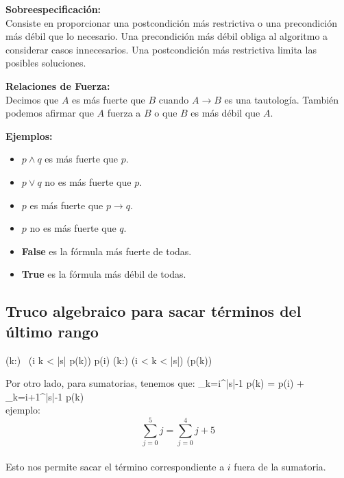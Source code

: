 \documentclass[9pt]{extarticle}  %
\begin{document}
\noindent\textbf{Sobreespecificación:} \\
Consiste en proporcionar una postcondición más restrictiva o una precondición más débil que lo necesario. Una precondición más débil obliga al algoritmo a considerar casos innecesarios. Una postcondición más restrictiva limita las posibles soluciones.

\noindent\textbf{Relaciones de Fuerza:} \\
Decimos que \(A\) es más fuerte que \(B\) cuando \(A \rightarrow B\) es una tautología. También podemos afirmar que \(A\) fuerza a \(B\) o que \(B\) es más débil que \(A\).

\noindent\textbf{Ejemplos:}
\begin{itemize}
\vspace{-0.3cm}
    \item \(p \land q\) es más fuerte que \(p\).
    \vspace{-0.3cm}
    \item \(p \lor q\) no es más fuerte que \(p\).
\vspace{-0.3cm}
    \item \(p\) es más fuerte que \(p \rightarrow q\).
    \vspace{-0.3cm}
    \item \(p\) no es más fuerte que \(q\).
    \vspace{-0.3cm}
    \item \textbf{False} es la fórmula más fuerte de todas.
    \vspace{-0.3cm}
    \item \textbf{True} es la fórmula más débil de todas.
    \vspace{-0.3cm}
\end{itemize}
\subsection*{\tiny {Truco algebraico para sacar términos del último rango}}
    \vspace{-0.2cm}
(\forall k:\ent) \, (i \leq k < |s| \implicaLuego p(k)) \equiv \land p(i) (\forall k:\ent ) (i < k < |s|) \implicaLuego (p(k))

Por otro lado, para sumatorias, tenemos que:
\sum_{k=i}^{|s|-1} p(k) = p(i) + \sum_{k=i+1}^{|s|-1} p(k)
\\ ejemplo:
\[ \sum_{j=0}^{5} j = \sum_{j=0}^{4} j + 5 \] \\
Esto nos permite sacar el término correspondiente a \( i \) fuera de la sumatoria.
\end{document}
